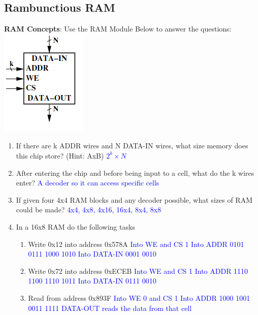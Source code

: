 \documentclass{article}
\begin{document}
\begin{enumerate}[label=(\alph*)]
\section{Rambunctious RAM}
    \textbf{RAM Concepts}: Use the RAM Module Below to answer the questions:
    \newline
    \includegraphics{figures/RAM.png}
    \begin{enumerate}[label=(\alph*),itemsep = 10pt]
        \item If there are k ADDR wires and N DATA-IN wires, what size memory does this chip store? (Hint: AxB)
        \newline \textcolor{blue}{$2^k \times N$}
        \item After entering the chip and before being input to a cell, what do the k wires enter?
        \newline \textcolor{blue}{A decoder so it can access specific cells}
        \item If given four 4x4 RAM blocks and any decoder possible, what sizes of RAM could be made?
        \newline \textcolor{blue}{4x4, 4x8, 4x16, 16x4, 8x4, 8x8}
        \item In a 16x8 RAM do the following tasks
        \begin{enumerate}[label=(\roman*),itemsep = 10pt]
            \item Write 0x12 into address 0x578A
            \newline \textcolor{blue}{Into WE and CS 1 \newline Into ADDR 0101 0111 1000 1010 \newline Into DATA-IN 0001 0010}
            \item Write 0x72 into address 0xECEB
            \newline \textcolor{blue}{Into WE and CS 1 \newline Into ADDR 1110 1100 1110 1011 \newline Into DATA-IN 0111 0010}
            \item Read from address 0x893F
            \newline \textcolor{blue}{Into WE 0 and CS 1 \newline Into ADDR 1000 1001 0011 1111 \newline DATA-OUT reads the data from that cell}
        \end{enumerate}
    \end{enumerate}


\end{enumerate}
\end{document}
